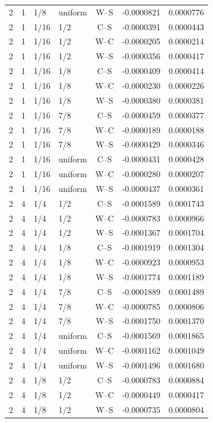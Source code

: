 \begin{longtable}{rrllcrr}
2 & 1 & 1/8 & uniform & W--S & -0.0000821 & 0.0000776 \\
2 & 1 & 1/16 & 1/2 & C--S & -0.0000391 & 0.0000443 \\
2 & 1 & 1/16 & 1/2 & W--C & -0.0000205 & 0.0000214 \\
2 & 1 & 1/16 & 1/2 & W--S & -0.0000356 & 0.0000417 \\
2 & 1 & 1/16 & 1/8 & C--S & -0.0000409 & 0.0000414 \\
2 & 1 & 1/16 & 1/8 & W--C & -0.0000230 & 0.0000226 \\
2 & 1 & 1/16 & 1/8 & W--S & -0.0000380 & 0.0000381 \\
2 & 1 & 1/16 & 7/8 & C--S & -0.0000459 & 0.0000377 \\
2 & 1 & 1/16 & 7/8 & W--C & -0.0000189 & 0.0000188 \\
2 & 1 & 1/16 & 7/8 & W--S & -0.0000429 & 0.0000346 \\
2 & 1 & 1/16 & uniform & C--S & -0.0000431 & 0.0000428 \\
2 & 1 & 1/16 & uniform & W--C & -0.0000280 & 0.0000207 \\
2 & 1 & 1/16 & uniform & W--S & -0.0000437 & 0.0000361 \\
2 & 4 & 1/4 & 1/2 & C--S & -0.0001589 & 0.0001743 \\
2 & 4 & 1/4 & 1/2 & W--C & -0.0000783 & 0.0000966 \\
2 & 4 & 1/4 & 1/2 & W--S & -0.0001367 & 0.0001704 \\
2 & 4 & 1/4 & 1/8 & C--S & -0.0001919 & 0.0001304 \\
2 & 4 & 1/4 & 1/8 & W--C & -0.0000923 & 0.0000953 \\
2 & 4 & 1/4 & 1/8 & W--S & -0.0001774 & 0.0001189 \\
2 & 4 & 1/4 & 7/8 & C--S & -0.0001889 & 0.0001489 \\
2 & 4 & 1/4 & 7/8 & W--C & -0.0000785 & 0.0000806 \\
2 & 4 & 1/4 & 7/8 & W--S & -0.0001750 & 0.0001370 \\
2 & 4 & 1/4 & uniform & C--S & -0.0001569 & 0.0001865 \\
2 & 4 & 1/4 & uniform & W--C & -0.0001162 & 0.0001049 \\
2 & 4 & 1/4 & uniform & W--S & -0.0001496 & 0.0001680 \\
2 & 4 & 1/8 & 1/2 & C--S & -0.0000783 & 0.0000884 \\
2 & 4 & 1/8 & 1/2 & W--C & -0.0000449 & 0.0000417 \\
2 & 4 & 1/8 & 1/2 & W--S & -0.0000735 & 0.0000804 \\

\end{longtable}
